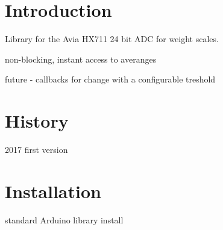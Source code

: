 \hypertarget{index_intro_sec}{}\section{Introduction}\label{index_intro_sec}
Library for the Avia H\+X711 24 bit A\+DC for weight scales.


\begin{DoxyItemize}
\item non-\/blocking, instant access to averanges
\item future -\/ callbacks for change with a configurable treshold
\end{DoxyItemize}\hypertarget{index_hist_sec}{}\section{History}\label{index_hist_sec}

\begin{DoxyItemize}
\item 2017 first version
\end{DoxyItemize}\hypertarget{index_install_sec}{}\section{Installation}\label{index_install_sec}
standard Arduino library install 